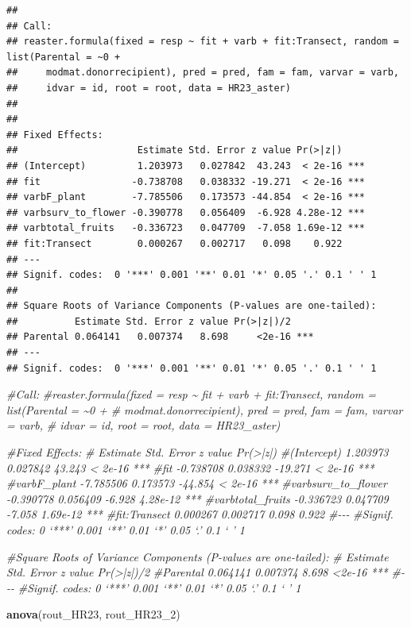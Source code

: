 \documentclass[
]{article}
\newenvironment{Shaded}{\begin{snugshade}}{\end{snugshade}}
\newcommand{\CommentTok}[1]{\textcolor[rgb]{0.56,0.35,0.01}{\textit{#1}}}
\newcommand{\FunctionTok}[1]{\textcolor[rgb]{0.13,0.29,0.53}{\textbf{#1}}}
\newcommand{\NormalTok}[1]{#1}
\begin{document}
\begin{verbatim}
## 
## Call:
## reaster.formula(fixed = resp ~ fit + varb + fit:Transect, random = list(Parental = ~0 + 
##     modmat.donorrecipient), pred = pred, fam = fam, varvar = varb, 
##     idvar = id, root = root, data = HR23_aster)
## 
## 
## Fixed Effects:
##                     Estimate Std. Error z value Pr(>|z|)    
## (Intercept)         1.203973   0.027842  43.243  < 2e-16 ***
## fit                -0.738708   0.038332 -19.271  < 2e-16 ***
## varbF_plant        -7.785506   0.173573 -44.854  < 2e-16 ***
## varbsurv_to_flower -0.390778   0.056409  -6.928 4.28e-12 ***
## varbtotal_fruits   -0.336723   0.047709  -7.058 1.69e-12 ***
## fit:Transect        0.000267   0.002717   0.098    0.922    
## ---
## Signif. codes:  0 '***' 0.001 '**' 0.01 '*' 0.05 '.' 0.1 ' ' 1
## 
## Square Roots of Variance Components (P-values are one-tailed):
##          Estimate Std. Error z value Pr(>|z|)/2    
## Parental 0.064141   0.007374   8.698     <2e-16 ***
## ---
## Signif. codes:  0 '***' 0.001 '**' 0.01 '*' 0.05 '.' 0.1 ' ' 1
\end{verbatim}

\begin{Shaded}
\begin{Highlighting}[]
\CommentTok{\#Call:}
\CommentTok{\#reaster.formula(fixed = resp \textasciitilde{} fit + varb + fit:Transect, random = list(Parental = \textasciitilde{}0 + }
\CommentTok{\#    modmat.donorrecipient), pred = pred, fam = fam, varvar = varb, }
\CommentTok{\#    idvar = id, root = root, data = HR23\_aster)}


\CommentTok{\#Fixed Effects:}
\CommentTok{\#                    Estimate Std. Error z value Pr(\textgreater{}|z|)    }
\CommentTok{\#(Intercept)         1.203973   0.027842  43.243  \textless{} 2e{-}16 ***}
\CommentTok{\#fit                {-}0.738708   0.038332 {-}19.271  \textless{} 2e{-}16 ***}
\CommentTok{\#varbF\_plant        {-}7.785506   0.173573 {-}44.854  \textless{} 2e{-}16 ***}
\CommentTok{\#varbsurv\_to\_flower {-}0.390778   0.056409  {-}6.928 4.28e{-}12 ***}
\CommentTok{\#varbtotal\_fruits   {-}0.336723   0.047709  {-}7.058 1.69e{-}12 ***}
\CommentTok{\#fit:Transect        0.000267   0.002717   0.098    0.922    }
\CommentTok{\#{-}{-}{-}}
\CommentTok{\#Signif. codes:  0 ‘***’ 0.001 ‘**’ 0.01 ‘*’ 0.05 ‘.’ 0.1 ‘ ’ 1}

\CommentTok{\#Square Roots of Variance Components (P{-}values are one{-}tailed):}
\CommentTok{\#         Estimate Std. Error z value Pr(\textgreater{}|z|)/2    }
\CommentTok{\#Parental 0.064141   0.007374   8.698     \textless{}2e{-}16 ***}
\CommentTok{\#{-}{-}{-}}
\CommentTok{\#Signif. codes:  0 ‘***’ 0.001 ‘**’ 0.01 ‘*’ 0.05 ‘.’ 0.1 ‘ ’ 1}

\FunctionTok{anova}\NormalTok{(rout\_HR23, rout\_HR23\_2)}
\end{Highlighting}
\end{Shaded}
\end{document}
